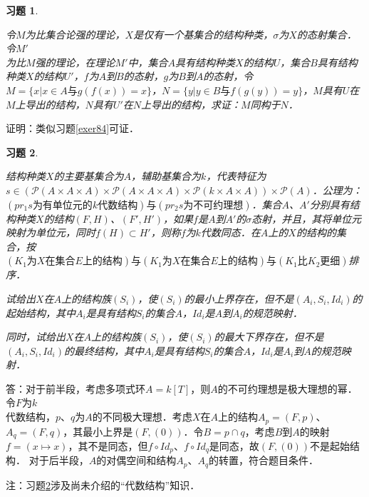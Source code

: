 \documentclass[12pt, a4paper, oneside]{book}
\newtheorem{exer}{习题}
\begin{document}
			\begin{exer}\label{exer203}
				\hfill\par
				令$M$为比集合论强的理论，$X$是仅有一个基集合的结构种类，$\sigma$为$X$的态射集合．令$M'$\\为比$M$强的理论，在理论$M'$中，集合$A$具有结构种类$X$的结构$U$，集合$B$具有结构种类$X$的结构$U'$，$f$为$A$到$B$的态射，$g$为$B$到$A$的态射，令$M=\{x|x\in A\text{与}g(f(x))=x\}$，$N=\{y|y\in B\text{与}f(g(y))=y\}$，$M$具有$U$在$M$上导出的结构，$N$具有$U'$在$N$上导出的结构，求证：$M$同构于$N$．
			\end{exer}
			证明：类似习题\ref{exer84}可证．
			
			\begin{exer}\label{exer204}
				\hfill\par
				结构种类$X$的主要基集合为$A$，辅助基集合为$k$，代表特征为$s\in (\mathcal{P}(A\times A\times A)\times \mathcal{P}(A\times A\times A)\times \mathcal{P}(k\times A\times A))\times \mathcal{P}(A)$．公理为：$(pr_1s\text{为有单位元的}k\text{代数结构})\text{与}(pr_2s\text{为不可约理想})$．集合$A$、$A'$分别具有结构种类$X$的结构$(F, H)$、$(F', H')$，如果$f$是$A$到$A'$的$\sigma$态射，并且，其将单位元映射为单位元，同时$f(H)\subset H'$，则称$f$为$k$代数同态．在$A$上的$X$的结构的集合，按$(K_1\text{为}X\text{在集合}E\text{上的结构})\text{与}(K_1\text{为}X\text{在集合}E\text{上的结构})\text{与}(K_1\text{比}K_2\text{更细})$排序．
				\par
				试给出$X$在$A$上的结构族$(S_i)$，使$(S_i)$的最小上界存在，但不是$(A_i, S_i, Id_i)$的起始结构，其中$A_i$是具有结构$S_i$的集合$A$，$Id_i$是$A$到$A_i$的规范映射．
				\par
				同时，试给出$X$在$A$上的结构族$(S_i)$，使$(S_i)$的最大下界存在，但不是$(A_i, S_i, Id_i)$的最终结构，其中$A_i$是具有结构$S_i$的集合$A$，$Id_i$是$A_i$到$A$的规范映射．
			\end{exer}
			答：对于前半段，考虑多项式环$A=k[T]$，则$A$的不可约理想是极大理想的幂．令$F$为$k$\\代数结构，$p$、$q$为$A$的不同极大理想．考虑$X$在$A$上的结构$A_p=(F, p)$、$A_q=(F, q)$，其最小上界是$(F, (0))$．令$B= p\cap q$，考虑$B$到$A$的映射$f=(x\mapsto x)$，其不是同态，但$f\circ Id_p$、$f\circ Id_q$是同态，故$(F, (0))$不是起始结构．
			对于后半段，$A$的对偶空间和结构$A_p$、$A_q$的转置，符合题目条件．
			\par
			注：习题\ref{exer204}涉及尚未介绍的“代数结构”知识．
			
\end{document}
